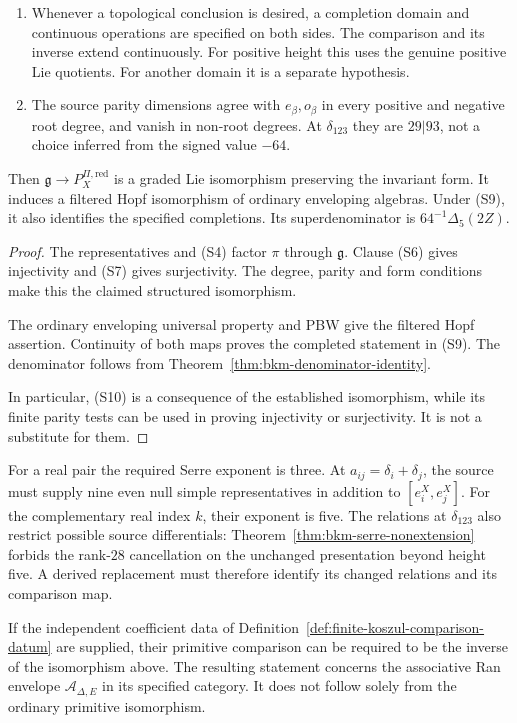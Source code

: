 \begin{theorem}
\begin{enumerate}
pieces of Proposition~\ref{prop:bkm-finite-filtered-pbw}. The
comparison uses these actual algebras, not envelopes of symmetric
root fragments.
\item[\textup{(S9)}] Whenever a topological conclusion is desired,
a completion domain and continuous operations are specified on
both sides. The comparison and its inverse extend continuously.
For positive height this uses the genuine positive Lie quotients.
For another domain it is a separate hypothesis.
\item[\textup{(S10)}] The source parity dimensions agree with
$e_\beta,o_\beta$ in every positive and negative root degree,
and vanish in non-root degrees. At $\delta_{123}$ they are
$29|93$, not a choice inferred from the signed value $-64$.
\end{enumerate}
Then $\mathfrak g\to P_X^{\Pi,\mathrm{red}}$ is a graded Lie
isomorphism preserving the invariant form. It induces a filtered
Hopf isomorphism of ordinary enveloping algebras. Under (S9), it
also identifies the specified completions. Its superdenominator
is $64^{-1}\Delta_5(2Z)$.
\end{theorem}
\begin{proof}
The representatives and (S4) factor $\pi$ through $\mathfrak g$.
Clause (S6) gives injectivity and (S7) gives surjectivity.
The degree, parity and form conditions make this the claimed
structured isomorphism.

The ordinary enveloping universal property
and PBW give the filtered Hopf assertion. Continuity of both maps
proves the completed statement in (S9). The denominator follows
from Theorem~\ref{thm:bkm-denominator-identity}.

In particular, (S10) is a consequence of the established
isomorphism, while its finite parity tests can be used in proving
injectivity or surjectivity. It is not a substitute for them.
\end{proof}

For a real pair the required Serre exponent is three.
At $a_{ij}=\delta_i+\delta_j$, the source must supply nine even
null simple representatives in addition to $[e_i^X,e_j^X]$.
For the complementary real index $k$, their exponent is five.
The relations at $\delta_{123}$ also restrict possible source
differentials: Theorem~\ref{thm:bkm-serre-nonextension} forbids the
rank-$28$ cancellation on the unchanged presentation beyond height
five. A derived replacement must therefore identify its changed
relations and its comparison map.

If the independent coefficient data of
Definition~\ref{def:finite-koszul-comparison-datum} are supplied,
their primitive comparison can be required to be the inverse of the
isomorphism above. The resulting statement concerns the associative
Ran envelope $\mathcal A_{\Delta,E}$ in its specified category.
It does not follow solely from the ordinary primitive isomorphism.

